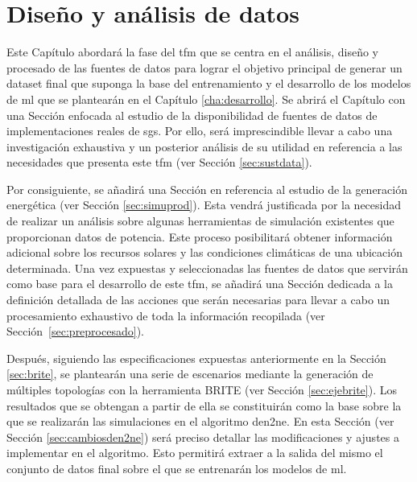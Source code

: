 \chapter{Diseño y análisis de datos}
\label{cha:analisis}

Este Capítulo abordará la fase del \gls{tfm} que se centra en el análisis, diseño y procesado de las fuentes de datos para lograr el objetivo principal de generar un dataset final que suponga la base del entrenamiento y el desarrollo de los modelos de \gls{ml} que se plantearán en el Capítulo \ref{cha:desarrollo}. Se abrirá el Capítulo con una Sección enfocada al estudio de la disponibilidad de fuentes de datos de implementaciones reales de \gls{sg}s. Por ello, será imprescindible llevar a cabo una investigación exhaustiva y un posterior análisis de su utilidad en referencia a las necesidades que presenta este \gls{tfm} (ver Sección \ref{sec:sustdata}).

\vspace{3mm}

Por consiguiente, se añadirá una Sección en referencia al estudio de la generación energética (ver Sección \ref{sec:simuprod}). Esta vendrá justificada por la necesidad de realizar un análisis sobre algunas herramientas de simulación existentes que proporcionan datos de potencia. Este proceso posibilitará obtener información adicional sobre los recursos solares y las condiciones climáticas de una ubicación determinada. Una vez expuestas y seleccionadas las fuentes de datos que servirán como base para el desarrollo de este \gls{tfm}, se añadirá una Sección dedicada a la definición detallada de las acciones que serán necesarias para llevar a cabo un procesamiento exhaustivo de toda la información recopilada (ver Sección~\ref{sec:preprocesado}). 

\vspace{3mm}

Después, siguiendo las especificaciones expuestas anteriormente en la Sección \ref{sec:brite}, se plantearán una serie de escenarios mediante la generación de múltiples topologías con la herramienta BRITE (ver Sección \ref{sec:ejebrite}). Los resultados que se obtengan a partir de ella se constituirán como la base sobre la que se realizarán las simulaciones en el algoritmo \gls{den2ne}. En esta Sección (ver Sección \ref{sec:cambiosden2ne}) será preciso detallar las modificaciones y ajustes a implementar en el algoritmo. Esto permitirá extraer a la salida del mismo el conjunto de datos final sobre el que se entrenarán los modelos de \gls{ml}.

